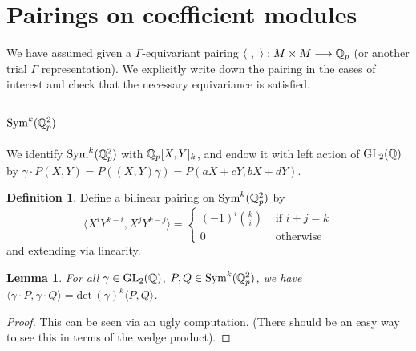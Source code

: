 \documentclass[12pt]{article}
\newtheorem{lem}[thm]{Lemma}
\theoremstyle{definition}
\newtheorem{defn}[thm]{Definition}
\def\Q{{\Bbb Q}}
\def\det{\text{det}\,}
\def\GL{\operatorname{GL}}
\def\Sym{\operatorname{Sym}}
\def\GL{\operatorname{GL}}
\def\CoInd{\operatorname{CoInd}}
\begin{document}
%
%
%

\section{Pairings on coefficient modules}

We have assumed given a $\Gamma$-equivariant pairing $\langle~,~ \rangle : M\times M \longrightarrow \Q_p$ (or another trial $\Gamma$ representation). We explicitly write down the pairing in the cases of interest and check that the necessary equivariance is satisfied. 

\subsection{$\Sym^k(\Q_p^2)$}

We identify $\Sym^k(\Q_p^2)$ with $\Q_p[X,Y]_k$, and endow it with left action of $\GL_2(\Q)$ by $\gamma \cdot P(X,Y) = P((X,Y)\gamma)=P(aX+cY,bX+dY).$ 
\begin{defn}
Define a bilinear pairing on $\Sym^k(\Q_p^2)$ by
\begin{equation*}
	\langle X^iY^{k-i}, X^j Y^{k-j} \rangle = \begin{cases} (-1)^i {k \choose i} & \text{ if } i+j=k\\
												0	& \text{ otherwise} \end{cases}
\end{equation*}
and extending via linearity.
\end{defn}


\begin{lem}
For all $\gamma\in \GL_2(\Q)$, $P,Q\in\Sym^k(\Q_p^2)$, we have $\langle \gamma\cdot P,\gamma \cdot Q\rangle = \det(\gamma)^k \langle P,Q\rangle$.
\end{lem}
\begin{proof}
This can be seen via an ugly computation. (There should be an easy way to see this in terms of the wedge product).
\end{proof}
\end{document}
